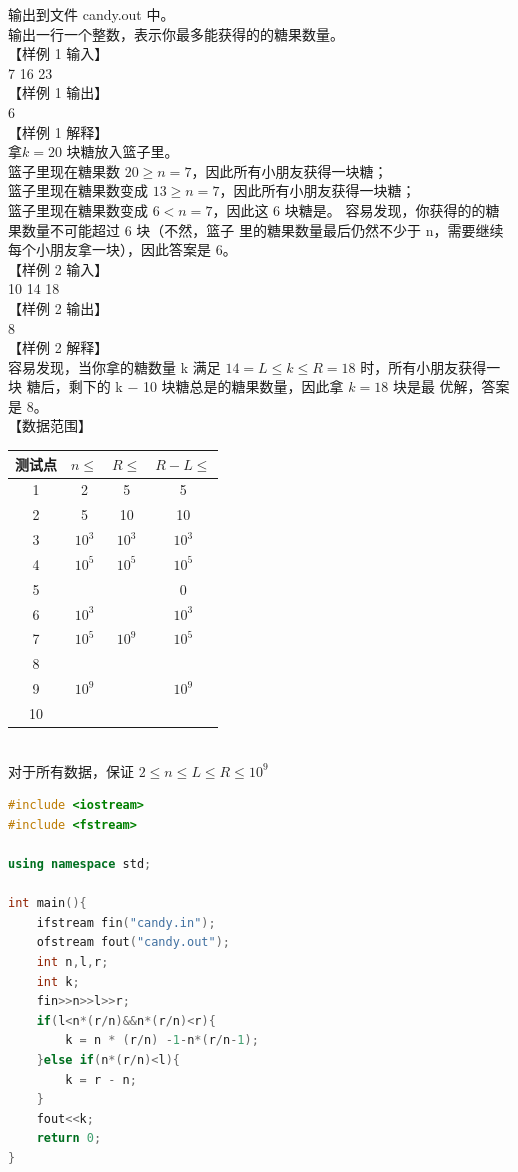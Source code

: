 \documentclass[12pt,twiside,a4paper]{ctexbook}
\numberwithin{chapter}{part}
\begin{document}
输出到文件 candy.out 中。\\
输出一行一个整数，表示你最多能获得的的糖果数量。\\
【样例 1 输入】\\
7 16 23\\
【样例 1 输出】\\
6\\
【样例 1 解释】\\
拿$k = 20$ 块糖放入篮子里。\\
篮子里现在糖果数 $20 \geq n = 7$，因此所有小朋友获得一块糖；\\
篮子里现在糖果数变成 $13 \geq n = 7$，因此所有小朋友获得一块糖；\\
篮子里现在糖果数变成 $6 < n = 7$，因此这 6 块糖是。
容易发现，你获得的的糖果数量不可能超过 6 块（不然，篮子
里的糖果数量最后仍然不少于 n，需要继续每个小朋友拿一块），因此答案是 6。\\
【样例 2 输入】\\
10 14 18\\
【样例 2 输出】\\
8\\
【样例 2 解释】\\
容易发现，当你拿的糖数量 k 满足 $14 = L \leq k \leq R = 18$ 时，所有小朋友获得一块
糖后，剩下的 k − 10 块糖总是的糖果数量，因此拿 $k = 18$ 块是最
优解，答案是 8。\\
【数据范围】\\
\begin{tabular}{|c|c|c|c|}
  \hline
  测试点 &  $n\leq$ & $R\leq$ & $R-L\leq$\\
  \hline
  1 & 2 & 5 & 5\\
  \hline
  2 & 5 & 10 & 10\\
  \hline
  3 & $10^3$ & $10^3$ & $10^3$\\
  \hline
  4 & $10^5$ & $10^5$ & $10^5$\\
  \hline
  5 & & & 0\\
  \cline{1-1}
  \cline{4-1}
  6 & $10^3$ & & $10^3$\\
  \cline{1-1}
  \cline{2-1}
  \cline{4-1}
  7 & $10^5$ & $10^9$ & $10^5$\\
  \cline{1-1}
  \cline{2-1}
  \cline{4-1}
  8 & & & \\
  \cline{1-1}
  9 & $10^9$ & & $10^{9}$\\
  \cline{1-1}
  10 & & &\\
  \hline
\end{tabular}\\
对于所有数据，保证 $2 \leq n \leq L \leq R \leq 10^9$
\begin{lstlisting}[language=C++]
#include <iostream>
#include <fstream>

using namespace std;

int main(){
	ifstream fin("candy.in");
	ofstream fout("candy.out");
	int n,l,r;
	int k;
	fin>>n>>l>>r;
	if(l<n*(r/n)&&n*(r/n)<r){
		k = n * (r/n) -1-n*(r/n-1);
	}else if(n*(r/n)<l){
		k = r - n;
	}
	fout<<k;
	return 0;
}
\end{lstlisting}
\end{document}
